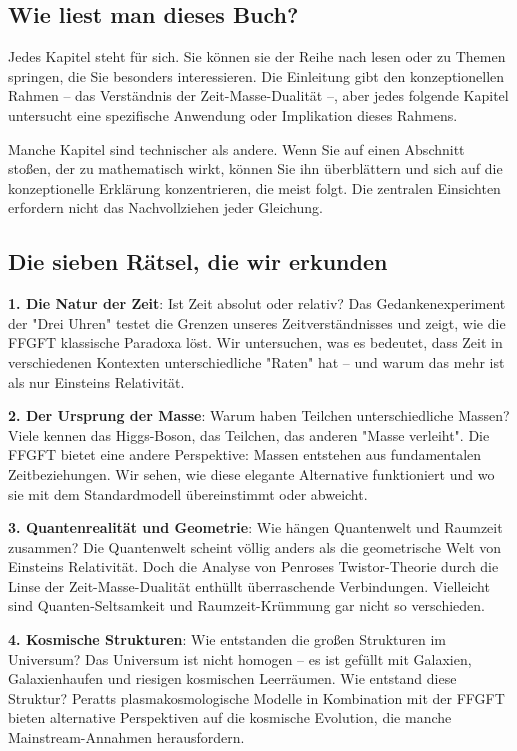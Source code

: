 \documentclass[11pt,oneside]{book}
\begin{document}
	\subsection*{Wie liest man dieses Buch?}
	
	Jedes Kapitel steht für sich. Sie können sie der Reihe nach lesen oder zu Themen springen, die Sie besonders interessieren. Die Einleitung gibt den konzeptionellen Rahmen – das Verständnis der Zeit-Masse-Dualität –, aber jedes folgende Kapitel untersucht eine spezifische Anwendung oder Implikation dieses Rahmens.
	
	Manche Kapitel sind technischer als andere. Wenn Sie auf einen Abschnitt stoßen, der zu mathematisch wirkt, können Sie ihn überblättern und sich auf die konzeptionelle Erklärung konzentrieren, die meist folgt. Die zentralen Einsichten erfordern nicht das Nachvollziehen jeder Gleichung.
	
	\subsection*{Die sieben Rätsel, die wir erkunden}
	
	\textbf{1. Die Natur der Zeit}: Ist Zeit absolut oder relativ? Das Gedankenexperiment der "Drei Uhren" testet die Grenzen unseres Zeitverständnisses und zeigt, wie die FFGFT klassische Paradoxa löst. Wir untersuchen, was es bedeutet, dass Zeit in verschiedenen Kontexten unterschiedliche "Raten" hat – und warum das mehr ist als nur Einsteins Relativität.
	
	\textbf{2. Der Ursprung der Masse}: Warum haben Teilchen unterschiedliche Massen? Viele kennen das Higgs-Boson, das Teilchen, das anderen "Masse verleiht". Die FFGFT bietet eine andere Perspektive: Massen entstehen aus fundamentalen Zeitbeziehungen. Wir sehen, wie diese elegante Alternative funktioniert und wo sie mit dem Standardmodell übereinstimmt oder abweicht.
	
	\textbf{3. Quantenrealität und Geometrie}: Wie hängen Quantenwelt und Raumzeit zusammen? Die Quantenwelt scheint völlig anders als die geometrische Welt von Einsteins Relativität. Doch die Analyse von Penroses Twistor-Theorie durch die Linse der Zeit-Masse-Dualität enthüllt überraschende Verbindungen. Vielleicht sind Quanten-Seltsamkeit und Raumzeit-Krümmung gar nicht so verschieden.
	
	\textbf{4. Kosmische Strukturen}: Wie entstanden die großen Strukturen im Universum? Das Universum ist nicht homogen – es ist gefüllt mit Galaxien, Galaxienhaufen und riesigen kosmischen Leerräumen. Wie entstand diese Struktur? Peratts plasmakosmologische Modelle in Kombination mit der FFGFT bieten alternative Perspektiven auf die kosmische Evolution, die manche Mainstream-Annahmen herausfordern.
	
\end{document}

